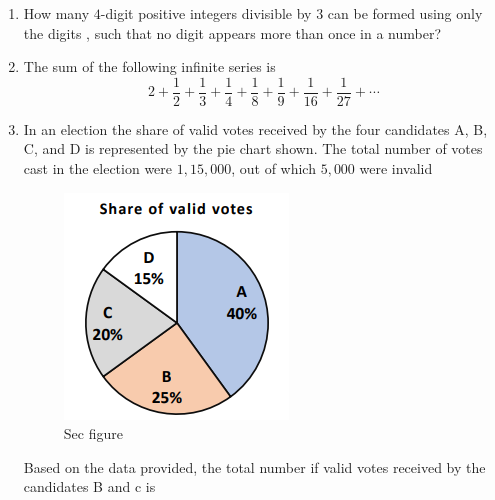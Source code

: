 \documentclass[journal]{IEEEtran}
\numberwithin{equation}{enumi}
\numberwithin{figure}{enumi}
\begin{document}
\begin{enumerate}[start=1, label={Q\arabic*.}]
\item How many $4$-digit positive integers divisible by $3$ can be formed using only the digits , such that no digit appears more than once in a number?
\begin{enumerate} 
  \end{enumerate}
\item The sum of the following infinite series is 
 \[
 2 + \frac{1}{2} + \frac{1}{3} + \frac{1}{4} + \frac{1}{8} + \frac{1}{9} + \frac{1}{16} + \frac{1}{27} + \cdots                              \]
 \begin{enumerate} 
  \end{enumerate}
  \newpage
\item In an election the share of valid votes received by the four candidates A, B, C, and D is represented by the pie chart shown. The total number of votes cast in the election were $1,15,000$, out of which $5,000$ were invalid
 \begin{figure}[H]
     \centering
     \includegraphics[width=0.5\linewidth]{figs/fig2.png}
     \caption{Sec figure}
     \label{fig:sec}
 \end{figure}
 Based on the data provided, the total number if valid votes received by the candidates B and c is


\end{enumerate}
\end{document}
